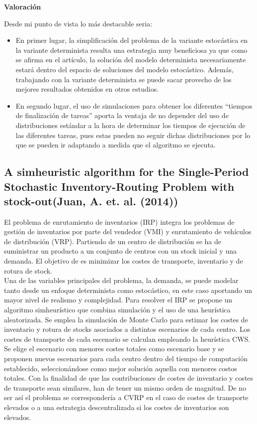 \documentclass[11pt]{article} %
\begin{document}
\textbf{Valoración}

Desde mi punto de vista lo más destacable seria:
\begin{itemize}
\item En primer lugar, la simplificación del problema de la variante estocástica en la variante determinista resulta una estrategia muy beneficiosa ya que como se afirma en el artículo, la solución del modelo determinista necesariamente estará dentro del espacio de soluciones del modelo estocástico. Además, trabajando con la variante determinista se puede sacar provecho de los mejores resultados obtenidos en otros estudios. 
\item En segundo lugar, el uso de simulaciones para obtener los diferentes “tiempos de finalización de tareas” aporta la ventaja de no depender del uso de distribuciones estándar a la hora de determinar los tiempos de ejecución de las diferentes tareas, pues estas pueden no seguir dichas distribuciones por lo que se pueden ir adaptando a medida que el algoritmo se ejecuta.
\end{itemize}

\subsection{A simheuristic algorithm for the Single-Period Stochastic Inventory-Routing Problem with stock-out(Juan, A. et. al. (2014))}

El problema de enrutamiento de inventarios (IRP) integra los problemas de gestión de inventarios por parte del vendedor (VMI) y enrutamiento de vehículos de distribución (VRP). Partiendo de un centro de distribución se ha de suministrar un producto a un conjunto de centros con un stock inicial y una demanda. El objetivo de es minimizar los costes de transporte, inventario y de rotura de stock. \\[0.2cm]
Una de las variables principales del problema, la demanda, se puede modelar tanto desde un enfoque determinista como estocástico, en este caso aportando un mayor nivel de realismo y complejidad. Para resolver el IRP se propone un algoritmo simheurístico que combina simulación y el uso de una heurística aleatorizada. Se emplea la simulación de Monte Carlo para estimar los costes de inventario y rotura de stocks asociados a distintos escenarios de cada centro. Los costes de transporte de cada escenario se calculan empleando la heurística CWS. Se elige el escenario con menores costes totales como escenario base y se proponen nuevos escenarios para cada centro dentro del tiempo de computación establecido, seleccionándose como mejor solución aquella con menores costos totales. Con la finalidad de que las contribuciones de costes de inventario y costes de transporte sean similares, han de tener un mismo orden de magnitud. De no ser así el problema se correspondería a CVRP en el caso de costes de transporte elevados o a una estrategia descentralizada si los costes de inventarios son elevados.\\[0.2cm]
\end{document}
